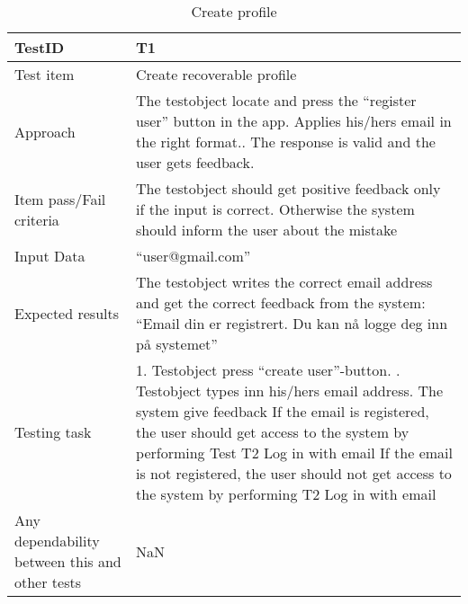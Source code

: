 \begin{table}[!h]
	\begin{center}
		\begin{tabular}{| p{5cm} | p{12cm} |}
			\hline
			TestID & T1 \\ \hline
			Test item & Create recoverable profile  \\ \hline
			Approach & The testobject locate and press the “register user” button in the app. Applies his/hers email in the right format.. The response is valid and the user gets feedback.  \\ \hline
			Item pass/Fail criteria & The testobject should get positive feedback only if the input is correct. Otherwise the system should inform the user about the mistake  \\ \hline
			Input Data & “user@gmail.com”  \\ \hline
			Expected results & The testobject writes the correct email address and get the correct feedback from the system: “Email din er registrert. Du kan nå logge deg inn på systemet”   \\ \hline
			Testing task & 1. Testobject press “create user”-button. \newline 2. Testobject types inn his/hers email address\newline
			3. The system give feedback \newline 4.1 If the email is registered, the user should get access to the system by        performing Test T2 Log in with email\newline 4.2 If the email is not registered, the user should not get access to the system by performing T2 Log in with email  \\ \hline
			Any dependability between this and other tests & NaN  \\ \hline
		\end{tabular}
	\end{center}
	\caption{Create profile}
	\label{Tab_systemtest1}
\end{table}

